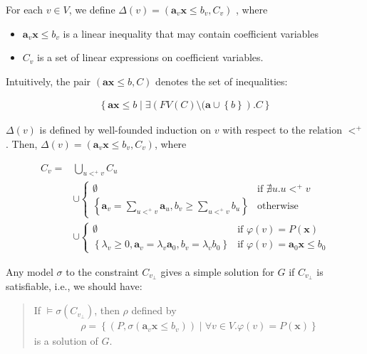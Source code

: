 \documentclass[a4paper,12pt]{article}
\begin{document}
For each $v \in V$, we define
$\Delta(v) = (\mathbf{a}_v \mathbf{x} \leq b_v, C_v)$
, where
\begin{itemize}
\item $\mathbf{a}_v \mathbf{x} \leq b_v$ is a linear inequality that
  may contain coefficient variables
\item $C_v$ is a set of linear expressions on coefficient variables.
\end{itemize}
Intuitively, the pair $(\mathbf{a} \mathbf{x} \leq b, C)$ denotes the
set of inequalities:

\begin{align*}
\left\lbrace
 \mathbf{a} \mathbf{x} \leq b \middle|
 \exists \left( FV(C)
  \setminus (\mathbf{a} \cup \left\lbrace b \right\rbrace
 \right). C
\right\rbrace
\end{align*}

$\Delta(v)$ is defined by well-founded induction on $v$ with respect
to the relation $<^+$. Then,
$\Delta(v) = \left( \mathbf{a}_v \mathbf{x} \leq b_v, C_v \right)$,
where

\begin{align*}
C_v = & \bigcup_{u <^+ v} C_u
\\
& \cup \begin{cases}
\emptyset
& \mbox{if } \nexists u. u <^+ v \\
\left\lbrace
 \mathbf{a}_v = \sum_{u <^+ v} \mathbf{a}_u,
 b_v \geq \sum_{u <^+ v} b_u
\right\rbrace
& \mbox{otherwise}
\end{cases}
\\
& \cup \begin{cases}
\emptyset
& \mbox{if } \varphi(v) = P(\mathbf{x}) \\
\left\lbrace
 \lambda_v \geq 0, \mathbf{a}_v = \lambda_v \mathbf{a}_0,
 b_v = \lambda_v b_0
\right\rbrace
& \mbox{if } \varphi(v) = \mathbf{a}_0 \mathbf{x} \leq b_0
\end{cases}
\end{align*}

Any model $\sigma$ to the constraint $C_{v_\bot}$ gives a simple
solution for $G$ if $C_{v_\bot}$ is satisfiable, i.e., we should have:

\begin{quote}
If $\models \sigma(C_{v_\bot})$, then $\rho$ defined by
\begin{align*}
 \rho = \left\lbrace
  \left( P, \sigma(\mathbf{a}_v \mathbf{x} \leq b_v) \right) \middle|
  \forall v \in V. \varphi(v) = P(\mathbf{x})
 \right\rbrace
\end{align*}
is a solution of $G$.
\end{quote}
\end{document}
